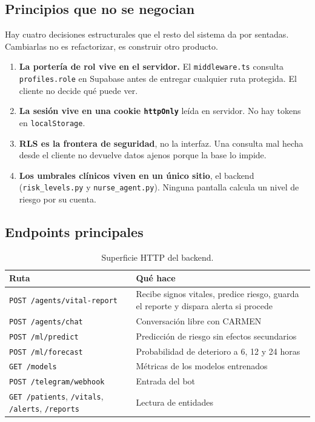 \documentclass[11pt,a4paper]{article}
\begin{document}
\subsection{Principios que no se negocian}

Hay cuatro decisiones estructurales que el resto del sistema da por sentadas.
Cambiarlas no es refactorizar, es construir otro producto.

\begin{enumerate}
\item \textbf{La portería de rol vive en el servidor.} El
  \texttt{middleware.ts} consulta \texttt{profiles.role} en Supabase antes de
  entregar cualquier ruta protegida. El cliente no decide qué puede ver.
\item \textbf{La sesión vive en una cookie \texttt{httpOnly}} leída en
  servidor. No hay tokens en \texttt{localStorage}.
\item \textbf{RLS es la frontera de seguridad}, no la interfaz. Una consulta
  mal hecha desde el cliente no devuelve datos ajenos porque la base lo impide.
\item \textbf{Los umbrales clínicos viven en un único sitio}, el backend
  (\texttt{risk\_levels.py} y \texttt{nurse\_agent.py}). Ninguna
  pantalla calcula un nivel de riesgo por su cuenta.
\end{enumerate}

\subsection{Endpoints principales}

\begin{table}[htbp]\centering
\begin{tabular}{@{}lp{8.6cm}@{}}
\toprule
\textbf{Ruta} & \textbf{Qué hace} \\
\midrule
\texttt{POST /agents/vital-report} & Recibe signos vitales, predice riesgo,
  guarda el reporte y dispara alerta si procede \\
\texttt{POST /agents/chat} & Conversación libre con CARMEN \\
\texttt{POST /ml/predict} & Predicción de riesgo sin efectos secundarios \\
\texttt{POST /ml/forecast} & Probabilidad de deterioro a 6, 12 y 24 horas \\
\texttt{GET /models} & Métricas de los modelos entrenados \\
\texttt{POST /telegram/webhook} & Entrada del bot \\
\texttt{GET /patients}, \texttt{/vitals}, \texttt{/alerts}, \texttt{/reports} & Lectura de entidades \\
\bottomrule
\end{tabular}
\caption{Superficie HTTP del backend.}
\end{table}
\end{document}
